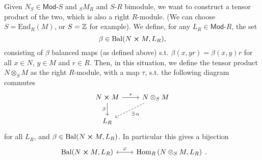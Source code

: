 \begin{rem}
	Given $N_S \in \mathsf{Mod}\text{-}S$ and ${}_S M_R$ and $S$-$R$ bimodule,
	we want to construct a tensor product of the two, which is also a right $R$-module.
	(We can choose $S = \mathrm{End}_{R}\left( M \right)$, or $S = \mathbb{Z}$ for example).
	We define, for any $L_R \in \mathsf{Mod}\text{-}R$, the set
	\begin{equation}
		\beta \in \mathrm{Bal}(N \cross M, L_R)
	,\end{equation} 
	consisting of $\beta$ balanced maps (as defined above) s.t. $\beta(x, yr) = \beta(x,y) r$
	for all $x \in N$, $y \in M$ and $r \in R$.
Then, in this situation, we define the tensor product $N \otimes_{S} M$ as the right $R$-module, with a map $\tau$, s.t.
the following diagram commutes
\begin{equation}
\begin{tikzcd}
	N \cross M \arrow[r, "\tau", rightarrow] \arrow[d, "\beta"', rightarrow] &
	N \otimes_S M \arrow[dl, "\exists\, \alpha", dashrightarrow] \\
	L_R &
\end{tikzcd}
\end{equation} 
for all $L_R$, and $\beta \in \mathrm{Bal}(N \cross M, L_R)$.
In particular this gives a bijection
\begin{equation}
\begin{tikzcd}
	\mathrm{Bal}(N \cross M, L_R) \arrow[r, "\varphi", leftrightarrow] &
	\mathrm{Hom}_{R} \left( N \otimes_S M, L_R \right)
\end{tikzcd}
.\end{equation} 
\end{rem}

